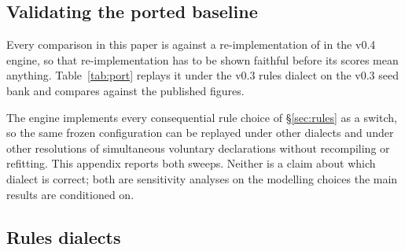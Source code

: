 \subsection{Validating the ported \vthree{} baseline}
\label{app:port}

Every comparison in this paper is against a re-implementation of \vthree{} in the
v0.4 engine, so that re-implementation has to be shown faithful before its scores
mean anything. Table~\ref{tab:port} replays it under the v0.3 rules dialect on
the v0.3 seed bank and compares against the published figures.

\begin{table}[!htbp]
\centering
\caption{\vthree{} as published \cite{fishbot03} versus the C++ port. Population:
\numPortDeals{} deals in two orientations, \numPortGames{} games per row, seed
$20260820$, v0.3 dialect, the seven opponents of the v0.3 study, ported weights
frozen. Intervals: deal-clustered percentile bootstrap on the port's win rate,
\numBootstrapDraws{} resamples.}
\label{tab:port}
\small

\end{table}

The engine implements every consequential rule choice of \S\ref{sec:rules} as a
switch, so the same frozen \vfast{} configuration can be replayed under other
dialects and under other resolutions of simultaneous voluntary declarations
without recompiling or refitting. This appendix reports both sweeps. Neither is
a claim about which dialect is correct; both are sensitivity analyses on the
modelling choices the main results are conditioned on.

\subsection{Rules dialects}
\label{app:dialects-rules}

\begin{table}[ht]
\centering
\caption{E7: the frozen \vfast{} configuration (\texttt{v04:mgate=0.008}, the
\numParams{}-coordinate fitted vector unchanged, no refitting) replayed under
three rules dialects against three opponents. Each cell is \numEsevenDeals{}
deals played in six seat rotations, \numEsevenGames{} games; seeds 828282 (v0.3
dialect), 838383 (48-card, eight-half-suit form) and 848484 (out-of-turn
declarations disabled), all disjoint from the fitting and selection banks.
``Win rate'' is \vfast{}'s share of games won; intervals are deal-clustered
percentile bootstrap, the 2.5\% and 97.5\% percentiles of \numBootstrapDraws{}
resamples of deals. Every row recorded an action-limit rate of \numLimitRate.
The full-dialect comparators quoted in the text come from E3
(Table~\ref{tab:h2h}), which is a different bank (\numHtHDeals{} deals, seed
90210), so the comparison is across banks as well as across dialects.}
\label{tab:rules}
\small

\end{table}

